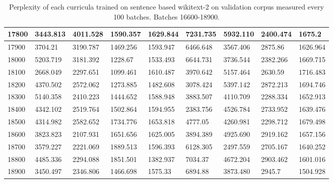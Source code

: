 \documentclass [11pt, proquest] {uwthesis}[2020/12/20]
\begin{document}
\begin{table}[]
\begin{tiny}
\begin{tabular}{|l|l|l|l|l|l|l|l|l|}
17800 & 3443.813 & 4011.528 & 1590.357 & 1629.844 & 7231.735 & 5932.110 & 2400.474 & 1675.2 \\ \hline
17900 & 3704.21 & 3190.787 & 1469.256 & 1593.947 & 6466.648 & 3567.406 & 2875.86 & 1626.964 \\ \hline
18000 & 5203.719 & 3181.392 & 1228.67 & 1533.493 & 6644.731 & 3736.544 & 2382.266 & 1669.715 \\ \hline
18100 & 2668.049 & 2297.651 & 1099.461 & 1610.487 & 3970.642 & 5157.464 & 2630.59 & 1716.483 \\ \hline
18200 & 4370.502 & 2572.062 & 1273.885 & 1482.608 & 3078.424 & 5397.142 & 2872.213 & 1694.746 \\ \hline
18300 & 5140.358 & 2410.223 & 1444.652 & 1588.948 & 3883.507 & 4110.709 & 2288.334 & 1652.913 \\ \hline
18400 & 4342.102 & 2519.764 & 1502.864 & 1594.955 & 2383.756 & 4526.784 & 2733.952 & 1639.476 \\ \hline
18500 & 4314.982 & 2582.652 & 1734.776 & 1653.818 & 4777.05 & 4260.981 & 2298.712 & 1679.498 \\ \hline
18600 & 3823.823 & 2107.931 & 1651.656 & 1625.005 & 3894.389 & 4925.690 & 2919.162 & 1657.156 \\ \hline
18700 & 3579.227 & 2221.069 & 1889.513 & 1596.393 & 6128.305 & 2497.559 & 2705.167 & 1640.252 \\ \hline
18800 & 4485.336 & 2294.088 & 1851.501 & 1382.937 & 7034.37 & 4672.204 & 2903.462 & 1601.016 \\ \hline
18900 & 3450.497 & 2346.806 & 1466.698 & 1575.33 & 6894.88 & 3873.480 & 2945.7 & 1504.928 \\ \hline
\end{tabular}
\end{tiny}
\caption{Perplexity of each curricula trained on sentence based wikitext-2 on validation corpus measured every 100 batches. Batches 16600-18900.}
\label{tab:wikitext-103-sentence-4}
\end{table}
\end{document}
